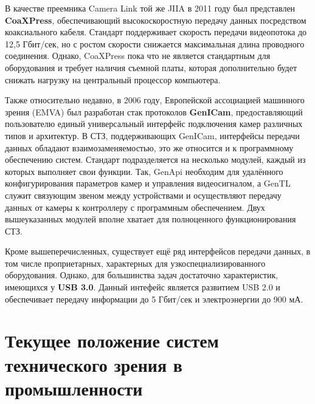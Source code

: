 В качестве преемника Camera Link той же JIIA в 2011 году был представлен \textbf{CoaXPress}, обеспечивающий высокоскоростную передачу данных посредством коаксиального кабеля. Стандарт поддерживает скорость передачи видеопотока до 12,5 Гбит/сек, но с ростом скорости снижается максимальная длина проводного соединения. Однако, CoaXPress пока что не является стандартным для оборудования и требует наличия съемной платы, которая дополнительно будет снижать нагрузку на центральный процессор компьютера.

Также относительно недавно, в 2006 году, Европейской ассоциацией машинного зрения (EMVA) был разработан стак протоколов \textbf{GenICam}, предоставляющий пользователю единый универсальный интерфейс подключения камер различных типов и архитектур. В СТЗ, поддерживающих GenICam, интерфейсы передачи данных обладают взаимозаменяемостью, это же относится и к программному обеспечению систем. Стандарт подразделяется на несколько модулей, каждый из которых выполняет свои функции. Так, GenApi необходим для удалённого конфигурирования параметров камер и управления видеосигналом, а GenTL служит связующим звеном между устройствами и осуществляют передачу данных от камеры к контроллеру с программным обеспечением. Двух вышеуказанных модулей вполне хватает для полноценного функционирования СТЗ.

Кроме вышеперечисленных, существует ещё ряд интерфейсов передачи данных, в том числе проприетарных, характерных для узкоспециализированного оборудования. Однако, для большинства задач достаточно характеристик, имеющихся у \textbf{USB 3.0}. Данный интефейс является развитием USB 2.0 и обеспечивает передачу информации до 5 Гбит/сек и электроэнергии до 900 мА.

\section{Текущее положение систем технического зрения в промышленности} \label{sect1_2}

